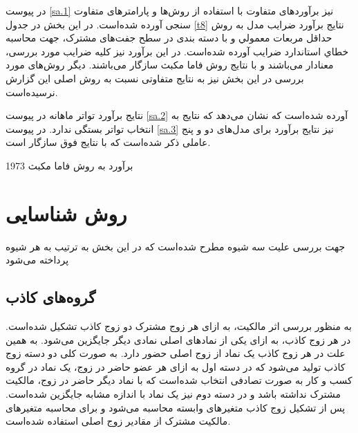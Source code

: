 \documentclass[12pt]{article}
\begin{document}
در پیوست 
\ref{sa.1}
نیز برآورد‌های متفاوت با استفاده از روش‌ها و پارامتر‌های متفاوت سنجی آورده شده‌است. در این بخش 
در جدول 
\ref{t8}
نتایج برآورد ضرایب مدل به روش حداقل مربعات معمولي و با
دسته بندی در سطح جفت‌های مشترک، جهت محاسبه خطاي استاندارد ضرايب آورده شده‌است. در این برآورد نیز کلیه ضرایب مورد بررسی، معنادار می‌باشند و با نتایج روش فاما مکبث سازگار می‌باشند. دیگر روش‌های مورد بررسی در این بخش نیز به نتایج متفاوتی نسبت به روش اصلی این گزارش نرسیده‌است.

نتایج برآورد  تواتر ماهانه در پیوست
\ref{sa.2}
آورده شده‌است که نشان می‌دهد که نتایج به انتخاب تواتر بستگی ندارد.
در پیوست 
\ref{sa.3}
نیز نتایج برآورد برای مدل‌های دو و پنج عاملی ذکر شده‌است که با نتایج فوق سازگار است.




\nopagebreak


\begin{table}[htbp]
\centering
\begin{LTR}
\lr{
   \resizebox{\textwidth}{!}{
   
   }
   }
\end{LTR}
\caption{برآورد به روش فاما مکبث 1973}
\label{t7}
\end{table}

\restoregeometry


\section{روش شناسایی }
جهت بررسی علیت سه شیوه مطرح شده‌است که در این بخش به ترتیب به هر شیوه پرداخته می‌شود
\subsection{گروه‌های کاذب} 

به منظور بررسی اثر مالکیت، به ازای هر زوج مشترک دو زوج کاذب تشکیل شده‌است. در هر زوج‌ کاذب، به ازای یکی از نماد‌های اصلی نمادی دیگر جایگزین می‌شود. به همین علت در هر زوج کاذب یک نماد از زوج اصلی حضور دارد. 
به صورت کلی دو دسته زوج کاذب تولید می‌شود که در دسته اول به ازای هر عضو حاضر در زوج، یک نماد در گروه کسب و کار به صورت تصادفی انتخاب شده‌است که با نماد دیگر حاضر در زوج، مالکیت مشترک نداشته باشد و در دسته دوم نیز یک نماد با اندازه مشابه جایگزین شده‌است. پس از تشکیل زوج کاذب متغیر‌های وابسته محاسبه می‌شود و برای محاسبه متغیر‌های مالکیت مشترک از مقادیر زوج اصلی استفاده شده‌است.
\end{document}
